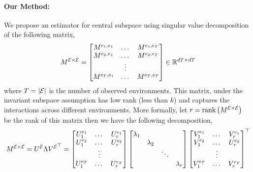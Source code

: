 \paragraph*{Our Method:} We propose an estimator for central subspace using singular value decomposition of the following matrix,
\begin{equation*}
    M^{\mathcal{E} \times \mathcal{E}} = 
    \begin{bmatrix}
        M^{e_1,e_1} & \dots & M^{e_1,e_T} \\
        M^{e_2, e_1} & \dots & M^{e_2, e_T} \\
         & \vdots & \\
        M^{e_T, e_1} & \dots & M^{e_T,e_T} \\
    \end{bmatrix}
    \in \mathbb{R}^{ dT \times dT }
\end{equation*}
where $T = \left| \mathcal{E} \right|$ is the number of observed environments. 
This matrix, under the invariant subspace assumption has low rank (less than $k$) and captures the interactions across different environments.
More formally, let $r = \operatorname{rank}\left( M^{\mathcal{E} \times \mathcal{E}} \right)$ be the rank of this matrix then we have the following decomposition,
\begin{equation*}
    M^{\mathcal{E} \times \mathcal{E}} = U^{\mathcal{E}} \Lambda {V^{ \mathcal{E} }}^{\top} =
    \begin{bmatrix}
        U_1^{e_1} & \dots & U_r^{e_1} \\
        U_1^{e_2} & \dots & U_r^{e_2} \\
        & \vdots & \\
        U_1^{e_T} & \dots & U_r^{e_T} \\
    \end{bmatrix}
    \begin{bmatrix}
        \lambda_1 & & & \\
        & \lambda_2 & & \\
        & & \ddots & \\
        & & & \lambda_r \\
    \end{bmatrix}
    \begin{bmatrix}
        V_1^{e_1} & \dots & V_r^{e_1} \\
        V_1^{e_2} & \dots & U_r^{e_2} \\
        & \vdots & \\
        V_1^{e_T} & \dots & V_r^{e_T} \\
    \end{bmatrix}^{\top}
\end{equation*}
